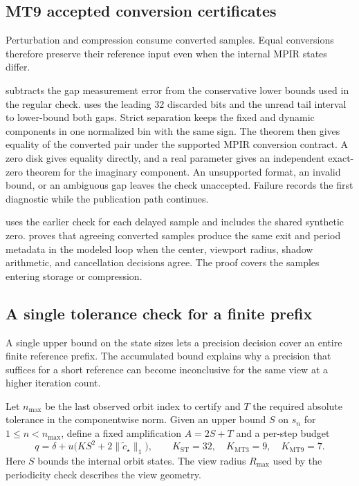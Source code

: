 \subsection{MT9 accepted conversion certificates}
\label{subsec:reference-orbit-proof-mt9-certificate}

Perturbation and compression consume converted samples. Equal conversions
therefore preserve their reference input even when the internal MPIR states
differ.

 subtracts the gap measurement error from
the conservative lower bounds used in the regular check.
 uses the leading 32 discarded bits and the
unread tail interval to lower-bound both gaps. Strict separation
keeps the fixed and dynamic components in one normalized bin with
the same sign. The theorem  then gives
equality of the converted pair under the supported MPIR conversion
contract. A zero disk gives equality directly, and a real parameter
gives an independent exact-zero theorem for the imaginary component.
An unsupported format, an invalid bound, or an ambiguous gap leaves
the check unaccepted. Failure records the first diagnostic while
the publication path continues.

 uses the earlier check for
each delayed sample and includes the shared synthetic zero.
 proves that agreeing
converted samples produce the same exit and period metadata in
the modeled loop when the center, viewport radius, shadow arithmetic,
and cancellation decisions agree. The proof covers the samples
entering storage or compression.

\subsection{A single tolerance check for a finite prefix}
\label{subsec:reference-orbit-proof-tolerance}

A single upper bound on the state sizes lets a precision decision cover an
entire finite reference prefix. The accumulated bound explains why a
precision that suffices for a short reference can become inconclusive for
the same view at a higher iteration count.

Let \(n_{\max}\) be the last observed orbit index to certify and \(T\) the
required absolute tolerance in the componentwise norm. Given an upper bound
\(S\) on \(s_n\) for \(1\le n<n_{\max}\), define a fixed amplification
\(A=2S+T\) and a per-step budget
\[
  q=\delta+u\bigl(KS^2+2\lVert\widetilde c_\star\rVert_1\bigr),
  \qquad K_{\mathrm{ST}}=32,\quad K_{\mathrm{MT3}}=9,\quad K_{\mathrm{MT9}}=7 .
\]
Here \(S\) bounds the internal orbit states. The view radius \(R_{\max}\)
used by the periodicity check describes the view geometry.

